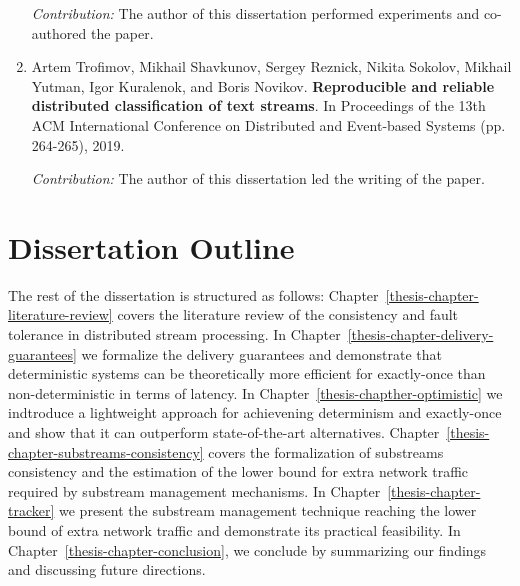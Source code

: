 \begin{enumerate}
    \textit{Contribution:} The author of this dissertation performed experiments and co-authored the paper.

    \item Artem Trofimov, Mikhail Shavkunov, Sergey Reznick, Nikita Sokolov, Mikhail Yutman, Igor Kuralenok, and Boris Novikov. \textbf{Reproducible and reliable distributed classification of text streams}. In Proceedings of the 13th ACM International Conference on Distributed and Event-based Systems (pp. 264-265), 2019. \newline
    
    \textit{Contribution:} The author of this dissertation led the writing of the paper.
\end{enumerate}

\section{Dissertation Outline}

The rest of the dissertation is structured as follows: Chapter~\ref{thesis-chapter-literature-review} covers the literature review of the consistency and fault tolerance in distributed stream processing. In Chapter~\ref{thesis-chapter-delivery-guarantees} we formalize the delivery guarantees and demonstrate that deterministic systems can be theoretically more efficient for exactly-once than non-deterministic in terms of latency. In Chapter~\ref{thesis-chapther-optimistic} we indtroduce a lightweight approach for achievening determinism and exactly-once and show that it can outperform state-of-the-art alternatives. Chapter~\ref{thesis-chapter-substreams-consistency} covers the formalization of substreams consistency and the estimation of the lower bound for extra network traffic required by substream management mechanisms. In Chapter~\ref{thesis-chapter-tracker} we present the substream management technique reaching the lower bound of extra network traffic and demonstrate its practical feasibility. In Chapter~\ref{thesis-chapter-conclusion}, we conclude by summarizing our findings and discussing future directions.